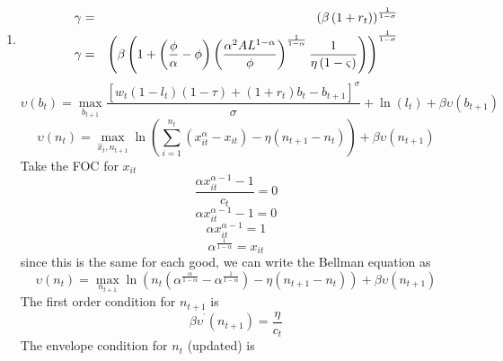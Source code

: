 \documentclass[11pt]{article}
\begin{document}
\begin{enumerate}
\item 
\begin{eqnarray*}
\gamma  &=&\left( \beta \left( 1+r_{t}\right) \right) ^{\frac{1}{1-\sigma }}
\\
\gamma  &=&\left( \beta \left( 1+\left( \frac{\phi }{\alpha }-\phi \right)
\left( \frac{\alpha ^{2}AL^{1-\alpha }}{\phi }\right) ^{\frac{1}{1-\alpha }}%
\frac{1}{\eta \left( 1-\varsigma \right) }\right) \right) ^{\frac{1}{%
1-\sigma }}
\end{eqnarray*}%
\begin{equation*}
\upsilon \left( b_{t}\right) =\underset{b_{t+1}}{\max }\frac{\left[
w_{t}\left( 1-l_{t}\right) \left( 1-\tau \right) +\left( 1+r_{t}\right)
b_{t}-b_{t+1}\right] ^{\sigma }}{\sigma }+\ln \left( l_{t}\right) +\beta
\upsilon \left( b_{t+1}\right) 
\end{equation*}%
\begin{equation*}
\upsilon \left( n_{t}\right) =\underset{\hat{x}_{t},n_{t+1}}{\max }\ln
\left( \overset{n_{t}}{\underset{i=1}{\sum }}\left( x_{it}^{\alpha
}-x_{it}\right) -\eta \left( n_{t+1}-n_{t}\right) \right) +\beta \upsilon
\left( n_{t+1}\right) 
\end{equation*}%
Take the FOC for $x_{it}$%
\begin{equation*}
\frac{\alpha x_{it}^{\alpha -1}-1}{c_{t}}=0
\end{equation*}%
\begin{equation*}
\alpha x_{it}^{\alpha -1}-1=0
\end{equation*}%
\begin{equation*}
\alpha x_{it}^{\alpha -1}=1
\end{equation*}%
\begin{equation*}
\alpha ^{\frac{1}{1-\alpha }}=x_{it}
\end{equation*}%
since this is the same for each good, we can write the Bellman equation as 
\begin{equation*}
\upsilon \left( n_{t}\right) =\underset{n_{t+1}}{\max }\ln \left(
n_{t}\left( \alpha ^{\frac{\alpha }{1-\alpha }}-\alpha ^{\frac{1}{1-\alpha }%
}\right) -\eta \left( n_{t+1}-n_{t}\right) \right) +\beta \upsilon \left(
n_{t+1}\right) 
\end{equation*}%
The first order condition for $n_{t+1}$ is 
\begin{equation*}
\beta \upsilon ^{^{\prime }}\left( n_{t+1}\right) =\frac{\eta }{c_{t}}
\end{equation*}%
The envelope condition for $n_{t}$ (updated) is%
\begin{equation*}

\end{equation*}
\end{enumerate}
\end{document}
